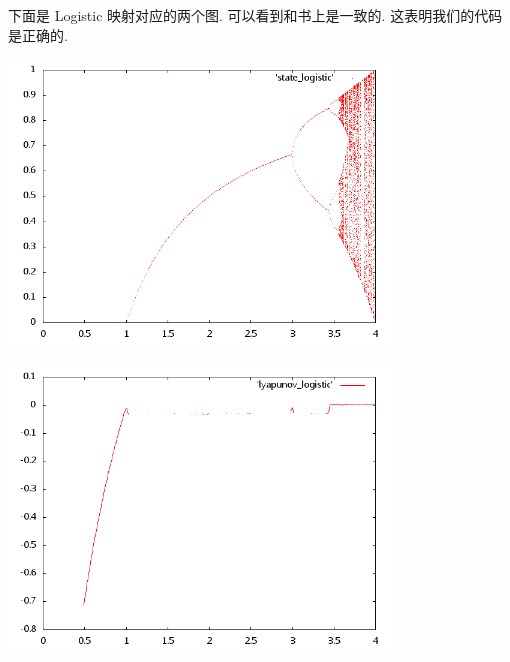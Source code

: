 \documentclass{ctexart}
\begin{document}
下面是 Logistic 映射对应的两个图. 可以看到和书上是一致的. 这表明我们的代码是正确的.
\begin{center}
\includegraphics[width=4in]{state_logistic.png}
\end{center}

\begin{center}
\includegraphics[width=4in]{lyapunov_logistic.png}
\end{center}
\end{document}
